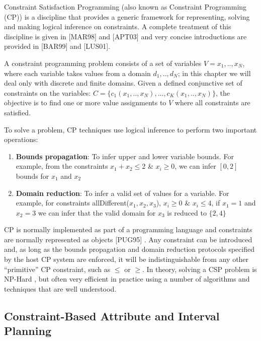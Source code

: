 Constraint Satisfaction Programming (also known as Constraint
Programming (CP)) is a discipline that provides a generic framework for
representing, solving and making logical inference on constraints. A
complete treatment of this discipline is given in [MAR98] and [APT03]
and very concise introductions are provided in [BAR99] and
[LUS01].

A constraint programming problem consists of a set of variables $V=
{x_1,..,x_N}$, where each variable takes values from a domain
$d_1,..,d_N$; in this chapter we will deal only with discrete and
finite domains. Given a defined conjunctive set of constraints on the
variables: $C=\{c_1(x_1,..,x_N), ..., c_K(x_1,..,x_N)\}$, the objective
is to find one or more value assignments to $V$ where all constraints
are satisfied.

To solve a problem, CP techniques use logical inference to perform two
important operations:

\begin{enumerate}

\item \textbf{Bounds propagation}: To infer upper and lower variable
  bounds. For example, from the constraints $x_1 + x_2 \leq 2$ \&
  $x_i \geq 0$, we can infer $[0,2]$ bounds for $x_1$ and $x_2$

\item \textbf{Domain reduction}: To infer a valid set of values for a variable.
  For example, for  constraints allDifferent($x_1,x_2,x_3$), $x_i \geq
  0$ \& $x_i \leq 4$, if $x_1 = 1$ and $x_2 = 3$ we can infer that the
  valid domain for $x_3$ is reduced  to $\{2,4\}$

\end{enumerate}

CP is normally implemented as part of a programming language and
constraints are normally represented as objects [PUG95]
. Any constraint can be introduced and, as long as the
bounds propagation and domain reduction protocols specified by the host
CP system are enforced, it will be indistinguishable from any other
``primitive'' CP constraint, such as $\leq$ or $\geq$. In theory,
solving a CSP problem is NP-Hard \cite{ghallab04}, but often very
efficient in practice using a number of algorithms and techniques that
are well understood.


\subsection{Constraint-Based Attribute and Interval Planning}
\label{sec:europa:cp}

